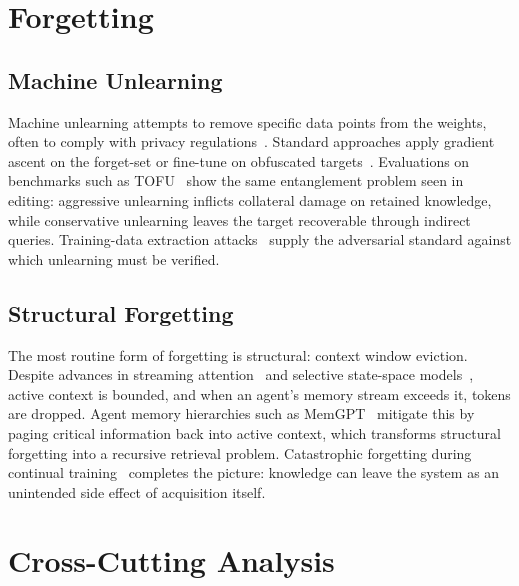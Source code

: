 \documentclass[manuscript, screen, review]{jair}
\begin{document}
\section{Forgetting}
\label{sec:forgetting}

\subsection{Machine Unlearning}

Machine unlearning attempts to remove specific data points from the weights, often to comply with privacy regulations~\citep{jang2023unlearning}. Standard approaches apply gradient ascent on the forget-set or fine-tune on obfuscated targets~\citep{eldan2023harrypotter}. Evaluations on benchmarks such as TOFU~\citep{maini2024tofu} show the same entanglement problem seen in editing: aggressive unlearning inflicts collateral damage on retained knowledge, while conservative unlearning leaves the target recoverable through indirect queries. Training-data extraction attacks~\citep{carlini2021extraction} supply the adversarial standard against which unlearning must be verified.

\subsection{Structural Forgetting}

The most routine form of forgetting is structural: context window eviction. Despite advances in streaming attention~\citep{xiao2024streamingllm} and selective state-space models~\citep{gu2023mamba}, active context is bounded, and when an agent's memory stream exceeds it, tokens are dropped. Agent memory hierarchies such as MemGPT~\citep{packer2023memgpt} mitigate this by paging critical information back into active context, which transforms structural forgetting into a recursive retrieval problem. Catastrophic forgetting during continual training~\citep{kirkpatrick2017ewc, luo2023catastrophic} completes the picture: knowledge can leave the system as an unintended side effect of acquisition itself.

\section{Cross-Cutting Analysis}
\label{sec:analysis}
\end{document}

